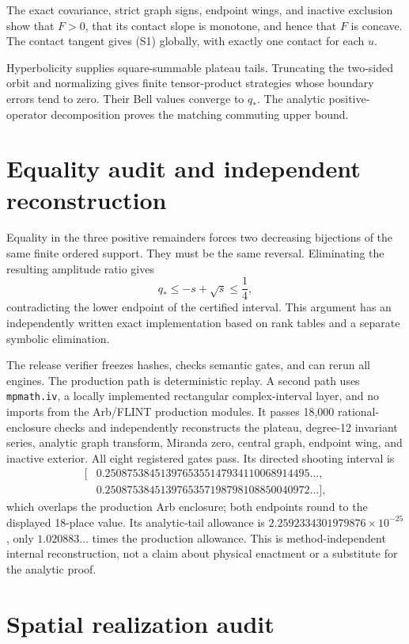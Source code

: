 \documentclass[11pt]{article}
\begin{document}
The exact covariance, strict graph signs, endpoint wings, and inactive
exclusion show that $F>0$, that its contact slope is monotone, and hence that
$F$ is concave.  The contact tangent gives (S1) globally, with exactly one
contact for each $u$.

Hyperbolicity supplies square-summable plateau tails.  Truncating the two-sided
orbit and normalizing gives finite tensor-product strategies whose boundary
errors tend to zero.  Their Bell values converge to $q_*$.  The analytic
positive-operator decomposition proves the matching commuting upper bound.

\section{Equality audit and independent reconstruction}

Equality in the three positive remainders forces two decreasing bijections of
the same finite ordered support.  They must be the same reversal.  Eliminating
the resulting amplitude ratio gives
\[
 q_*\le -s+\sqrt{s}\le\frac14,
\]
contradicting the lower endpoint of the certified interval.  This argument has
an independently written exact implementation based on rank tables and a
separate symbolic elimination.

The release verifier freezes hashes, checks semantic gates, and can rerun all
engines.  The production path is deterministic replay.  A second path uses
\texttt{mpmath.iv}, a locally implemented rectangular complex-interval layer,
and no imports from the Arb/FLINT production modules.  It passes 18,000
rational-enclosure checks and independently reconstructs the plateau,
degree-12 invariant series, analytic graph transform, Miranda zero, central
graph, endpoint wing, and inactive exterior.  All eight registered gates pass.
Its directed shooting interval is
\[
\begin{split}
[&0.2508753845139765355147934110068914495\ldots,\\
 &0.2508753845139765357198798108850040972\ldots],
\end{split}
\]
which overlaps the production Arb enclosure; both endpoints round to the
displayed 18-place value.  Its analytic-tail allowance is
$2.2592334301979876\times10^{-25}$, only $1.020883\ldots$ times the production
allowance.  This is method-independent internal reconstruction, not a claim
about physical enactment or a substitute for the analytic proof.

\section{Spatial realization audit}
\end{document}
